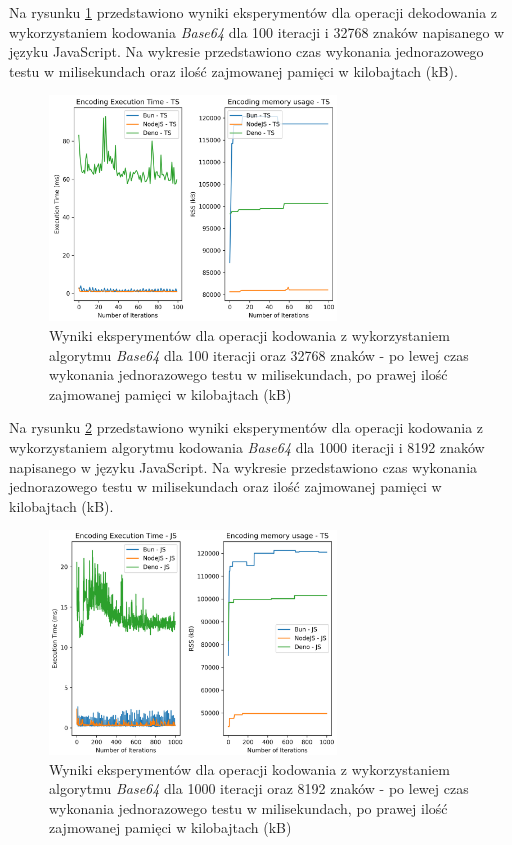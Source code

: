 Na rysunku \ref{fig:decoding_e1_ts} przedstawiono wyniki eksperymentów dla operacji dekodowania z wykorzystaniem kodowania \textit{Base64} dla 100 iteracji i 32768 znaków napisanego w języku JavaScript. Na wykresie przedstawiono czas wykonania jednorazowego testu w milisekundach oraz ilość zajmowanej pamięci w kilobajtach (kB).

\begin{figure}[H]
  \centering
  \includegraphics[width=0.68\textwidth]{Figures/coding/base64_100_encoding_ts.png}
  \caption{Wyniki eksperymentów dla operacji kodowania z wykorzystaniem algorytmu \textit{Base64} dla 100 iteracji oraz 32768 znaków - po lewej czas wykonania jednorazowego testu w milisekundach, po prawej ilość zajmowanej pamięci w kilobajtach (kB)}
  \label{fig:decoding_e1_ts}
\end{figure}

Na rysunku \ref{fig:encoding_e2_js} przedstawiono wyniki eksperymentów dla operacji kodowania z wykorzystaniem algorytmu kodowania \textit{Base64} dla 1000 iteracji i 8192 znaków napisanego w języku JavaScript. Na wykresie przedstawiono czas wykonania jednorazowego testu w milisekundach oraz ilość zajmowanej pamięci w kilobajtach (kB).

\begin{figure}[H]
  \centering
  \includegraphics[width=0.68\textwidth]{Figures/coding/base64_1000_encoding_js.png}
  \caption{Wyniki eksperymentów dla operacji kodowania z wykorzystaniem algorytmu \textit{Base64} dla 1000 iteracji oraz 8192 znaków - po lewej czas wykonania jednorazowego testu w milisekundach, po prawej ilość zajmowanej pamięci w kilobajtach (kB)}
  \label{fig:encoding_e2_js}
\end{figure}

